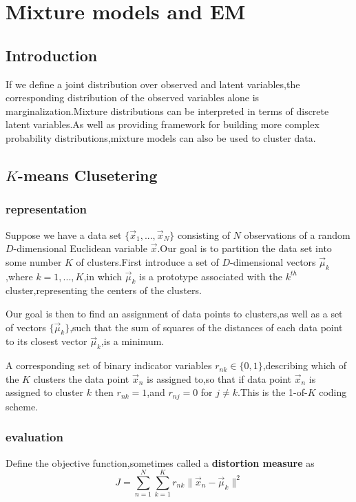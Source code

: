 \chapter{Mixture models and EM}
\label{chap:EM}

\section{Introduction}
If we define a joint distribution over observed and latent variables,the corresponding distribution of the observed variables alone is marginalization.Mixture distributions can be interpreted in terms of discrete latent variables.As well as providing framework for building more complex probability distributions,mixture models can also be used to cluster data.

\section{$K$-means Clusetering}
\subsection{representation}
Suppose we have a data set $\{\vec{x}_1,...,\vec{x}_N\}$ consisting of $N$ observations of a random $D$-dimensional Euclidean variable $\vec{x}$.Our goal is to partition the data set into some number $K$ of clusters.First introduce a set of $D$-dimensional vectors $\vec{\mu}_k$,where $k=1,...,K$,in which $\vec{\mu}_k$ is a prototype associated with the $k^{th}$ cluster,representing the centers of the clusters.

Our goal is then to find an assignment of data points to clusters,as well as a set of vectors $\{\vec{\mu}_k\}$,such that the sum of squares of the distances of each data point to its closest vector $\vec{\mu}_k$,is a minimum.

A corresponding set of binary indicator variables $r_{nk}\in \{0,1\}$,describing which of the $K$ clusters the data point $\vec{x}_n$ is assigned to,so that if data point $\vec{x}_n$ is assigned to cluster $k$ then $r_{nk}=1$,and $r_{nj}=0$ for $j\neq k$.This is the 1-of-$K$ coding scheme.


\subsection{evaluation}
Define the objective function,sometimes called a \textbf{distortion measure} as
\begin{equation}
J=\sum_{n=1}^{N}\sum_{k=1}^{K}r_{nk}\parallel \vec{x}_n-\vec{\mu}_k\parallel^2
\end{equation}

